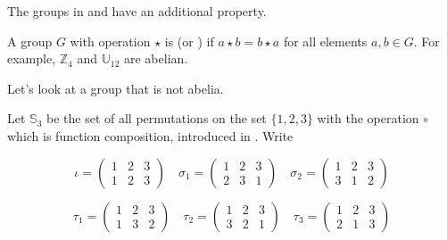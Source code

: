The groups in  and  have an additional property.

\begin{defn}
\label{defn_abelian}
    A group $G$ with operation $\star$ is  (or ) if 
    $a \star b = b \star a$ for all elements 
    $a, b \in G$.  For example, $\mathbb{Z}_4$ and $\mathbb{U}_{12}$ are abelian.
\end{defn}

Let's look at a group that is not abelia.

\begin{exam}
\label{exam_nonabel_permgp}
    Let $\mathbb{S}_3$ be the set of all permutations on the set $\{1,2,3\}$ with the operation $\circ$ which is function composition, introduced in .  Write

    $$\iota = \left( \begin{array}{ccc} 1 & 2 & 3 \\ 1 & 2 & 3\end{array} \right) \quad \sigma_1 = \left( \begin{array}{ccc} 1 & 2 & 3 \\ 2 & 3 & 1\end{array} \right) \quad \sigma_2 = \left( \begin{array}{ccc} 1 & 2 & 3 \\ 3 & 1 & 2\end{array} \right)$$

    $$\tau_1 = \left( \begin{array}{ccc} 1 & 2 & 3 \\ 1 & 3 & 2\end{array} \right) \quad \tau_2 = \left( \begin{array}{ccc} 1 & 2 & 3 \\ 3 & 2 & 1\end{array} \right) \quad \tau_3 = \left( \begin{array}{ccc} 1 & 2 & 3 \\ 2 & 1 & 3\end{array} \right)$$


\end{exam}
